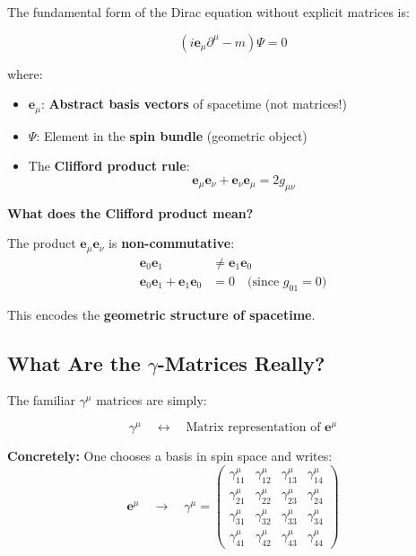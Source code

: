 The fundamental form of the Dirac equation without explicit matrices is:

\begin{equation}
	\boxed{(i \mathbf{e}_\mu \partial^\mu - m)\Psi = 0}
	\label{eq:clifford_fundamental}
\end{equation}

where:
\begin{itemize}
	\item $\mathbf{e}_\mu$: \textbf{Abstract basis vectors} of spacetime (not matrices!)
	\item $\Psi$: Element in the \textbf{spin bundle} (geometric object)
	\item The \textbf{Clifford product rule}:
	\begin{equation}
		\mathbf{e}_\mu \mathbf{e}_\nu + \mathbf{e}_\nu \mathbf{e}_\mu = 2 g_{\mu\nu}
		\label{eq:clifford_product_rule}
	\end{equation}
\end{itemize}

\textbf{What does the Clifford product mean?}

The product $\mathbf{e}_\mu \mathbf{e}_\nu$ is \textbf{non-commutative}:
\begin{align}
	\mathbf{e}_0 \mathbf{e}_1 &\neq \mathbf{e}_1 \mathbf{e}_0 \\
	\mathbf{e}_0 \mathbf{e}_1 + \mathbf{e}_1 \mathbf{e}_0 &= 0 \quad \text{(since } g_{01} = 0\text{)}
\end{align}

This encodes the \textbf{geometric structure of spacetime}.

\subsection{What Are the $\gamma$-Matrices Really?}
\label{subsec:what_are_gammas}

The familiar $\gamma^\mu$ matrices are simply:

\begin{equation}
	\gamma^\mu \quad \longleftrightarrow \quad \text{Matrix representation of } \mathbf{e}^\mu
\end{equation}

\textbf{Concretely:} One chooses a basis in spin space and writes:
\begin{equation}
	\mathbf{e}^\mu \quad \rightarrow \quad \gamma^\mu = 
	\begin{pmatrix}
		\gamma^\mu_{11} & \gamma^\mu_{12} & \gamma^\mu_{13} & \gamma^\mu_{14} \\
		\gamma^\mu_{21} & \gamma^\mu_{22} & \gamma^\mu_{23} & \gamma^\mu_{24} \\
		\gamma^\mu_{31} & \gamma^\mu_{32} & \gamma^\mu_{33} & \gamma^\mu_{34} \\
		\gamma^\mu_{41} & \gamma^\mu_{42} & \gamma^\mu_{43} & \gamma^\mu_{44}
	\end{pmatrix}
\end{equation}

